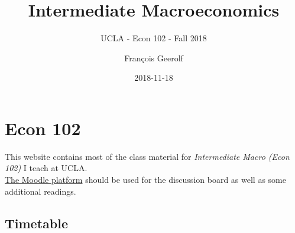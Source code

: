 \documentclass[]{book}
\title{Intermediate Macroeconomics}
\subtitle{UCLA - Econ 102 - Fall 2018}
\author{François Geerolf}
\date{2018-11-18}
\theoremstyle{definition}
\theoremstyle{definition}
\theoremstyle{definition}
\theoremstyle{remark}
\begin{document}
\maketitle

{
\setcounter{tocdepth}{2}
\tableofcontents
}
\listoftables
\listoffigures
\chapter*{Econ 102}\label{econ-102}

This website contains most of the class material for \emph{Intermediate
Macro (Econ 102)} I teach at UCLA.\\
\href{https://moodle2.sscnet.ucla.edu/course/view/18F-ECON102-1}{The
Moodle platform} should be used for the discussion board as well as some
additional readings.

\section*{Timetable}\label{timetable}
\end{document}
